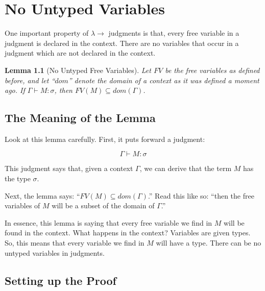 \documentclass{book}
\numberwithin{equation}{chapter}
\newtheorem{lemma}{Lemma}
\begin{document}
\chapter{No Untyped Variables}

One important property of $\lambda\rightarrow$ judgments is that, every free variable in a judgment is declared in the context. There are no variables that occur in a judgment which are not declared in the context.

\begin{lemma}[No Untyped Free Variables]
Let $FV$ be the free variables as defined before, and let ``$dom$'' denote the domain of a context as it was defined a moment ago. If $\Gamma \vdash M : \sigma$, then $FV(M) \subseteq dom(\Gamma)$.
\end{lemma}


\section{The Meaning of the Lemma}

Look at this lemma carefully. First, it puts forward a judgment:

\begin{equation}
\Gamma \vdash M : \sigma
\end{equation}

\noindent
This judgment says that, given a context $\Gamma$, we can derive that the term $M$ has the type $\sigma$.

Next, the lemma says: ``$FV(M) \subseteq dom(\Gamma)$.'' Read this like so: ``then the free variables of $M$ will be a subset of the domain of $\Gamma$.''

In essence, this lemma is saying that every free variable we find in $M$ will be found in the context. What happens in the context? Variables are given types. So, this means that every variable we find in $M$ will have a type. There can be no untyped variables in judgments.


\section{Setting up the Proof}
\end{document}
